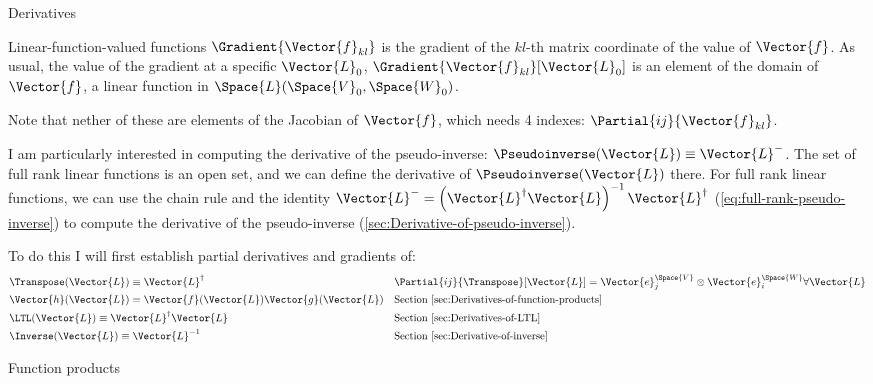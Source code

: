 \begin{plSection}{Derivatives}
\begin{plSection}{Linear-function-valued functions}
$\Gradient{\Vector{f}_{kl}}$ is the gradient of the $kl$-th matrix coordinate of the value of $\Vector{f}$.
As usual, the value of the gradient at a specific $\Vector{L}_0$,
$\Gradient{\Vector{f}_{kl}}[\Vector{L}_0]$ 
is an element of the domain of $\Vector{f}$,
a linear function in $\Space{L}(\Space{V}_0,\Space{W}_0)$.

Note that nether of these are elements of the Jacobian of $\Vector{f}$,
which needs 4 indexes: $\Partial{ij}{\Vector{f}_{kl}}$.

I am particularly interested in computing the derivative of the
pseudo-inverse: $\Pseudoinverse(\Vector{L}) \equiv \Vector{L}^{-}$.
The set of full rank linear functions is an open set,
and we can define the derivative of $\Pseudoinverse(\Vector{L})$ there.
For full rank linear functions,
we can use the chain rule and the identity
$\Vector{L}^{-} = \left( \Vector{L}^{\dagger} \Vector{L} \right)^{-1} \Vector{L}^{\dagger}$
(\cref{eq:full-rank-pseudo-inverse})
to compute the derivative of the pseudo-inverse
(\cref{sec:Derivative-of-pseudo-inverse}).

To do this I will first establish partial derivatives and gradients of:
\begin{equation}
\begin{aligned}
\label{eq:transpose-derivative}
&\Transpose(\Vector{L}) \equiv \Vector{L}^{\dagger}
&&\Partial{ij}{\Transpose}[\Vector{L}]
 =  \Vector{e}_j^{\Space{V}} \otimes \Vector{e}_i^{\Space{W}}
\forall \Vector{L}
\\
&\Vector{h}( \Vector{L} ) = \Vector{f} ( \Vector{L} ) \Vector{g} ( \Vector{L} )
&&\text{Section~\ref{sec:Derivatives-of-function-products} }
\\
&\LTL(\Vector{L}) \equiv \Vector{L}^{\dagger} \Vector{L}
&&\text{Section~\ref{sec:Derivatives-of-LTL} }
\\
&\Inverse(\Vector{L}) \equiv \Vector{L}^{-1}
&&\text{Section~\ref{sec:Derivative-of-inverse} }
\end{aligned}
\end{equation}

\begin{plSection}{Function products}
\label{sec:Derivatives-of-function-products}


\end{plSection}
\end{plSection}
\end{plSection}
